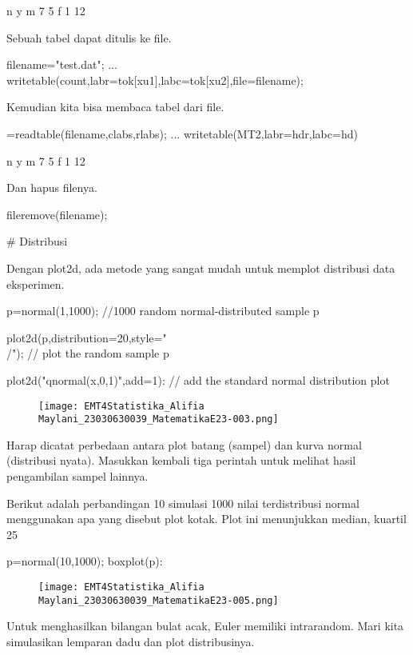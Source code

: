 \documentclass{article}
\begin{document}
                       n         y
             m         7         5
             f         1        12

Sebuah tabel dapat ditulis ke file.


\>filename="test.dat"; ...  
\>   writetable(count,labr=tok[xu1],labc=tok[xu2],file=filename);


Kemudian kita bisa membaca tabel dari file.


=readtable(filename,\>clabs,\>rlabs); ...  
\>   writetable(MT2,labr=hdr,labc=hd)


                       n         y
             m         7         5
             f         1        12

Dan hapus filenya.


\>fileremove(filename);


# Distribusi

Dengan plot2d, ada metode yang sangat mudah untuk memplot distribusi
data eksperimen.


\>p=normal(1,1000); //1000 random normal-distributed sample p

\>plot2d(p,distribution=20,style="\\/"); // plot the random sample p

\>plot2d("qnormal(x,0,1)",add=1): // add the standard normal distribution plot


\begin{figure}
    \centering
    \texttt{[image: EMT4Statistika\_Alifia Maylani\_23030630039\_MatematikaE23-003.png]}
    \caption{}
    \label{fig:enter-label}
\end{figure}

Harap dicatat perbedaan antara plot batang (sampel) dan kurva normal
(distribusi nyata). Masukkan kembali tiga perintah untuk melihat hasil
pengambilan sampel lainnya.


Berikut adalah perbandingan 10 simulasi 1000 nilai terdistribusi
normal menggunakan apa yang disebut plot kotak. Plot ini menunjukkan
median, kuartil 25%


\>p=normal(10,1000); boxplot(p):


\begin{figure}
    \centering
    \texttt{[image: EMT4Statistika\_Alifia Maylani\_23030630039\_MatematikaE23-005.png]}
    \caption{}
    \label{fig:enter-label}
\end{figure}

Untuk menghasilkan bilangan bulat acak, Euler memiliki intrarandom.
Mari kita simulasikan lemparan dadu dan plot distribusinya.
\end{document}
